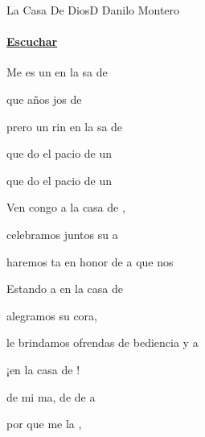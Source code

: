 \documentclass[12pt, spanish]{book}
\begin{document}
    \begin{song}{La Casa De Dios}{D}
    {} %
    {Danilo Montero}
    {} %
    {}
        \ifChordBk
        \paragraph{\mbox{}\hfill\protect\href{https://open.spotify.com/intl-es/track/2i9QGQ8Bco7lnOMbRntjY6}{Escuchar}\mbox{}\hfill}
        \fi


        \begin{SBOpGroup}
            Me es un  en la sa de 

            que  años jos de 

            prero un rin en la sa de 

            que do el pacio de un 

            que do el pacio de un 
        \end{SBOpGroup}

        \begin{SBChorus}
            Ven congo a la casa de ,

            celebramos juntos su a

            haremos ta en honor de a que nos 

            Estando a en la casa de 

            alegramos su cora,

            le brindamos ofrendas de bediencia y a

            ¡en la casa de !
        \end{SBChorus}


        \begin{SBOpGroup}
            de mi ma, de de a

            por  que me  la ,


\end{SBOpGroup}
\end{song}
\end{document}

